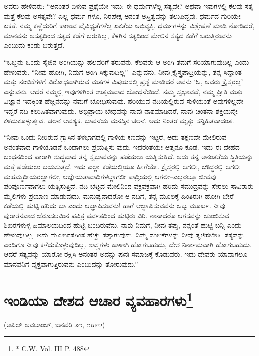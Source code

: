 ಅವರು ಹೇಳಿದರು: “ಅನಂತರ ಏಳುವ ಪ್ರಶ್ನೆಯೇ ಇದು; ಈ ಧರ್ಮಗಳೆಲ್ಲ ಸತ್ಯವೇ? ಅಥವಾ ಇವುಗಳಲ್ಲಿ ಕೆಲವು ಸತ್ಯ ಮತ್ತೆ ಕೆಲವು ಅಸತ್ಯವೇ? ಎಲ್ಲ ಧರ್ಮ ಗಳೂ, ನಿರಪೇಕ್ಷ ಅನಂತ ಅಸ್ತಿತ್ವವನ್ನು ತಲುಪಿದ್ದವು. ಧರ್ಮದ ಗುರಿಯೇ ಏಕತೆ. ನಮ್ಮ ಕಣ್ಣೆದುರಿಗೆ ಕಾಣುವ ವೈವಿಧ್ಯತೆಗಳೆಲ್ಲ ಏಕತೆಯ ಅಭಿವ್ಯಕ್ತಿ. ಧರ್ಮಗಳನ್ನು ವಿಶ್ಲೇಷಣೆ ಮಾಡಿ ನೋಡಿದರೆ, ಮಾನವನು ಅಸತ್ಯದಿಂದ ಸತ್ಯದ ಕಡೆಗೆ ಬರುತ್ತಿಲ್ಲ, ಕೆಳಗಿನ ಸತ್ಯದಿಂದ ಮೇಲಿನ ಸತ್ಯದ ಕಡೆಗೆ ಬರುತ್ತಿರುವನು ಎಂಬುದು ಕಂಡು ಬರುತ್ತದೆ.

“ಒಬ್ಬನು ಒಂದು ಸೈಜಿನ ಅಂಗಿಯನ್ನು ಹಲವರಿಗೆ ತರುವನು. ಕೆಲವರು ಆ ಅಂಗಿ ತಮಗೆ ಸರಿಯಾಗುವುದಿಲ್ಲ ಎಂದು ಹೇಳುವರು. “ನೀವು ಹೋಗಿ, ನಿಮಗೆ ಅಂಗಿ ಸಿಕ್ಕುವುದಿಲ್ಲ”, ಎನ್ನುವನು. ನೀವು ಕ್ರೈಸ್ತ್ರಪಾದ್ರಿಯನ್ನು, ತನ್ನ ಸಿದ್ದಾಂತ ಮತ್ತು ನಂಬಿಕೆಗಳಿಗೆ ವಿರೋಧವಾಗಿರುವ ಮತಗಳ ವಿಷಯದಲ್ಲಿ ಪ್ರಶ್ನೆ ಮಾಡಿದರೆ ಅವನು ‘ಓ, ಅವರು ಕ್ರೈಸ್ತರಲ್ಲ’ ಎನ್ನುವನು. ಆದರೆ ನಮ್ಮಲ್ಲಿ ಇವುಗಳಿಗಿಂತ ಉತ್ತಮವಾದ ಬೋಧನೆಯಿದೆ. ನಮ್ಮ ಸ್ವಭಾವವೆ, ನಮ್ಮ ಪ್ರೀತಿ ಮತ್ತು ವಿಜ್ಞಾನ ಇದಕ್ಕಿಂತ ಹೆಚ್ಚಿನದನ್ನು ನಮಗೆ ಬೋಧಿಸುವುವು. ಹರಿಯುವ ನದಿಯಲ್ಲಿರುವ ಸುಳಿಯಂತೆ ಅವುಗಳಿಲ್ಲದೇ ಇದ್ದರೆ ನದಿ ಕಲುಷಿತವಾಗುವುದು. ಅಭಿಪ್ರಾಯ ಬೇಧವನ್ನು ನಾವು ನಾಶಮಾಡಿದರೆ, ನಾವು ಚಿಂತನಾ ಶಕ್ತಿಯನ್ನೇ ಕಳೆದುಕೊಳ್ಳುತ್ತೇವೆ. ಚಲನೆ ಆವಶ್ಯಕ. ಭಾವನೆಯೆ ಮನಸ್ಸಿನ ಚಲನೆ. ಅದು ನಿಂತರೆ ಮೃತ್ಯು ಸನ್ನಿಹಿತವಾದಂತೆ.

“ನೀವು ಒಂದು ನೀರಿರುವ ಗ್ಲಾಸಿನ ತಳಭಾಗದಲ್ಲಿ ಗಾಳಿಯ ಕಣವನ್ನು ಇಟ್ಟರೆ, ಅದು ತಕ್ಷಣವೇ ಮೇಲಿರುವ ಅನಂತವಾದ ಗಾಳಿಯೊಡನೆ ಒಂದಾಗಲು ಪ್ರಯತ್ನಿಸು ವುದು. ಇದರಂತೆಯೇ ಆತ್ಮನೂ ಕೂಡ. ಇದು ಈ ದೇಹದ ಬಂಧನದಿಂದ ಪಾರಾಗಿ ಶುದ್ಧವಾದ ತನ್ನ ಸ್ವಭಾವವನ್ನು ಪಡೆಯಲು ಯತ್ನಿಸುತ್ತಿದೆ. ಅದು ತನ್ನ ಅನಂತತೆಯ ಸ್ಥಿತಿಯನ್ನು ಮತ್ತೆ ಪಡೆಯಲು ಬಯಸುತ್ತದೆ. ಇದು ಎಲ್ಲಾ ಕಡೆಯಲ್ಲಿಯೂ ಹೀಗೆಯೇ. ಕ್ರೈಸ್ತರಲ್ಲಿ ಆಗಲೀ, ಬೌದ್ಧರಲ್ಲಿ ಆಗಲೀ ಮಹಮ್ಮದೀಯರಲ್ಲಾಗಲೀ, ಆಜ್ಞೇಯತಾವಾದಿಗಳಲ್ಲಾಗಲೀ ಪಾದ್ರಿಯಲ್ಲಿ ಆಗಲೀ–ಎಲ್ಲರಲ್ಲೂ ಜೀವವು ಪರಿಪೂರ್ಣವಾಗಲು ಯತ್ನಿಸುತ್ತಿದೆ. ನದಿ ಬೆಟ್ಟದ ಮೇಲಿನಿಂದ ವಕ್ರವಕ್ರವಾಗಿ ಹರಿದು ಸಮುದ್ರವನ್ನು ಸೇರಲು ಸಾವಿರಾರು ಮೈಲಿಗಳು ಪ್ರಯಾಣ ಮಾಡುವುದು. ಮನುಷ್ಯನಾದರೋ ಆ ನದಿಗೆ, ತನ್ನ ಮೂಲಕ್ಕೆ ಹಿಂತಿರುಗಿ ಹೋಗಿ ಬೇರೆ ಕಡೆಯಲ್ಲಿ ಹುಟ್ಟಿ ಹರಿದು ಬಾ ಎಂದು ಆಜ್ಞಾಪಿಸುವನು! ಹಾಗೆ ಆಜ್ಞಾಪಿಸುವವನು ಒಬ್ಬ ಮೂರ್ಖ. ನೀವು ಪುರಾತನವಾದ ಜೆರೂಸಲಮಿನ ಪವಿತ್ರ ಪರ್ವತದಿಂದ ಹುಟ್ಟಿರು ವಿರಿ. ನಾನಾದರೊ ಆಗಸವನ್ನು ಚುಂಬಿಸುವ ಶಿಖರಗಳುಳ್ಳ ಹಿಮಾಲಯದಿಂದ ಹುಟ್ಟಿ ಬಂದಿರುವೆನು. ನಾನು ನಿಮಗೆ, ನೀವು ತಪ್ಪು, ನನ್ನಂತೆ ಹುಟ್ಟಿ ಬನ್ನಿ ಎಂದು ಹೇಳುವುದಿಲ್ಲ. ಅದು ಮೂರ್ಖತೆಗಿಂತ ಹೆಚ್ಚು ತಪ್ಪಾಗುವುದು. ನಿಮ್ಮ ನಂಬಿಕೆಗಳನ್ನು ನೀವು ತ್ಯಜಿಸಬೇಡಿ. ಸತ್ಯವನ್ನು ಎಂದಿಗೂ ನೀವು ಕಳೆದುಕೊಳ್ಳುವುದಿಲ್ಲ. ಶಾಸ್ತ್ರಗಳು ಹಾಳಾಗಿ ಹೋಗಬಹುದು, ದೇಶ ನಿರ್ನಾಮವಾಗಿ ಹೋಗಬಹುದು. ಆದರೆ ಸತ್ಯವನ್ನು ಯಾರೋ ರಕ್ಷಿಸಿ ಅನಂತರ ಅದನ್ನು ಪುನಃ ಸಮಾಜಕ್ಕೆ ಕೊಡುವರು. ಇದು ದೇವರು ಯಾವಾಗಲೂ ಮಾನವನಿಗೆ ವ್ಯಕ್ತವಾಗುತ್ತಿರುವನು ಎಂಬುದನ್ನು ತೋರುವುದು.”


\section[ಇಂಡಿಯಾ ದೇಶದ ಆಚಾರ ವ್ಯವಹಾರಗಳು]{ಇಂಡಿಯಾ ದೇಶದ ಆಚಾರ ವ್ಯವಹಾರಗಳು\protect\footnote{* C.W. Vol. III P. 488}}

\begin{center}
(ಅಪಿಲ್​ ಅವಲಾಂಚ್​, ಜನವರಿ ೨೧, ೧೮೯೪)
\end{center}

